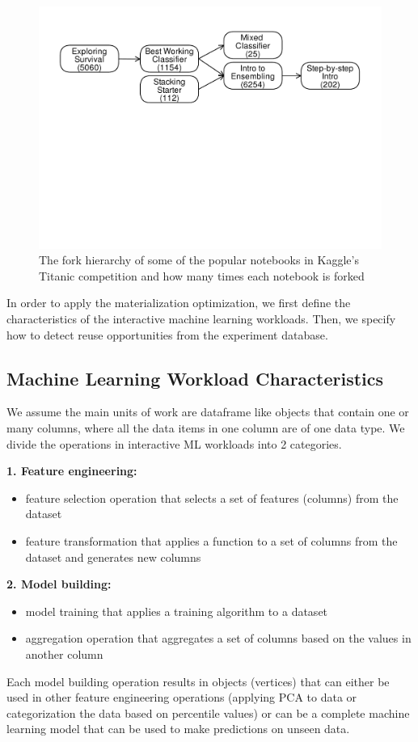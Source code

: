 \begin{figure}
\centering
\includegraphics[width=\columnwidth]{../images/kaggle-titanic-scripts-graph}
\caption{The fork hierarchy of some of the popular notebooks in Kaggle's Titanic competition and how many times each notebook is forked}
\label{fig-titanic-script-hierarchy}
\end{figure}

In order to apply the materialization optimization, we first define the characteristics of the interactive machine learning workloads.
Then, we specify how to detect reuse opportunities from the experiment database.

\subsection{Machine Learning Workload Characteristics}
We assume the main units of work are dataframe like objects that contain one or many columns, where all the data items in one column are of one data type.
We divide the operations in interactive ML workloads into 2 categories.

\textbf{1. Feature engineering:}
\begin{itemize}
\item feature selection operation that selects a set of features (columns) from the dataset
\item feature transformation that applies a function to a set of columns from the dataset and generates new columns
\end{itemize}


\textbf{2. Model building: }
\begin{itemize}
\item model training that applies a training algorithm to a dataset
\item aggregation operation that aggregates a set of columns based on the values in another column
\end{itemize}
Each model building operation results in objects (vertices) that can either be used in other feature engineering operations (applying PCA to data or categorization the data based on percentile values) or can be a complete machine learning model that can be used to make predictions on unseen data.

